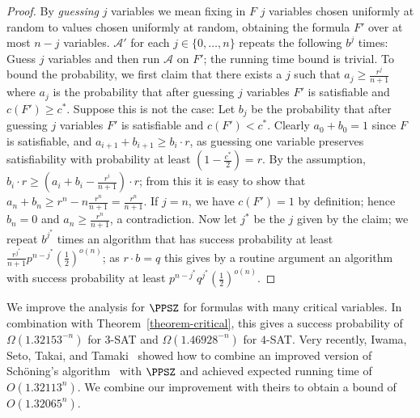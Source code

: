 \begin{proof}
By \emph{guessing} $j$ variables we mean fixing in $F$ $j$ variables chosen uniformly at random to values chosen uniformly at random, obtaining the formula $F'$ over at most $n-j$ variables. $\mathcal{A}'$ for each $j\in\{0,\dots,n\}$ repeats the following $b^j$ times: Guess $j$ variables and then run $\mathcal{A}$ on $F'$; the running time bound is trivial. To bound the probability, we first claim that there exists a $j$ such that $a_j\geq \frac{r^j}{n+1}$ where $a_j$ is the probability that after guessing $j$ variables $F'$ is satisfiable and $c(F')\geq c^*$. Suppose this is not the case: Let $b_j$ be the probability that after guessing $j$ variables $F'$ is satisfiable and $c(F')<c^*$. Clearly $a_0+b_0=1$ since $F$ is satisfiable, and $a_{i+1}+b_{i+1}\geq b_i\cdot r$, as guessing one variable preserves satisfiability with probability at least $\left(1-\frac{c^*}{2}\right)=r$. By the assumption, $b_i\cdot r\geq  \left(a_i+b_i-\frac{r^i}{n+1}\right)\cdot r$; from this it is easy to show that $a_n+b_n\geq  r^n-n\frac{r^n}{n+1}=\frac{r^n}{n+1}$. If $j=n$, we have $c(F')=1$ by definition; hence $b_n=0$ and $a_n\geq \frac{r^n}{n+1}$, a contradiction. Now let $j^*$ be the $j$ given by the claim; we repeat $b^{j^*}$ times an algorithm that has success probability at least $\frac{r^{j^*}}{n+1}p^{n-j^*}\left(\frac{1}{2}\right)^{o(n)}$; as $r\cdot b=q$ this gives by a routine argument an algorithm with success probability at least $p^{n-j^*}q^{j^*}\left(\frac{1}{2}\right)^{o(n)}$.
\end{proof}

We improve the analysis for $\PPSZ$ for formulas with many critical
variables. In combination with Theorem~\ref{theorem-critical}, this
gives a success probability of $\Omega\!\left(1.32153^{-n}\right)$
for $3$-SAT and $\Omega\!\left(1.46928^{-n}\right)$ for $4$-SAT\@.
Very recently, Iwama, Seto, Takai, and Tamaki~\cite{istt10} showed
how to combine an improved version of Sch\"oning's
algorithm~\cite{hofmeister02,bs03} with $\PPSZ$ and achieved expected running time of $O(1.32113^{n})$. We combine our improvement with
theirs to obtain a bound of $O(1.32065^{n})$.
\introductionAppendixExplanation

